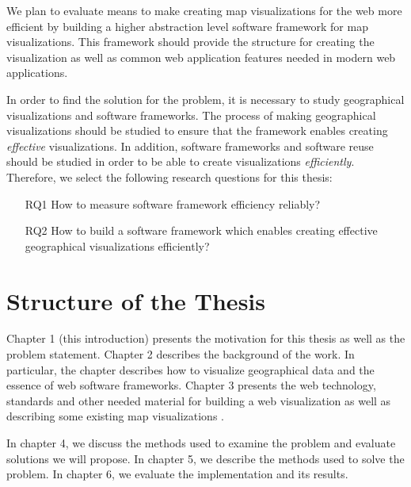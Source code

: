 We plan to evaluate means to make creating map visualizations for the web more efficient by building a higher abstraction level software framework for map visualizations. This framework should provide the structure for creating the visualization as well as common web application features needed in modern web applications.

In order to find the solution for the problem, it is necessary to study geographical visualizations and software frameworks. The process of making geographical visualizations should be studied to ensure that the framework enables creating \emph{effective} visualizations. In addition, software frameworks and software reuse should be studied in order to be able to create visualizations \emph{efficiently}. Therefore, we select the following research questions for this thesis:

\begin{enumerate}
	\item[RQ1] How to measure software framework efficiency reliably?
	\item[RQ2] How to build a software framework which enables creating effective geographical visualizations efficiently?
\end{enumerate}



\section{Structure of the Thesis}
\label{section:structure} 

Chapter 1 (this introduction) presents the motivation for this thesis as well as the problem statement. Chapter 2 describes the background of the work. In particular, the chapter describes how to visualize geographical data and the essence of web software frameworks. Chapter 3 presents the web technology, standards and other needed material for building a web visualization as well as describing some existing map visualizations .

In chapter 4, we discuss the methods used to examine the problem and evaluate solutions we will propose. In chapter 5, we describe the methods used to solve the problem. In chapter 6, we evaluate the implementation and its results. 



